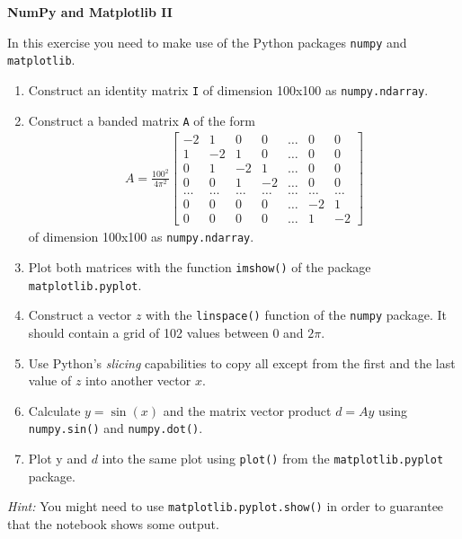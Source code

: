 \textbf{NumPy and Matplotlib II}

In this exercise you need to make use of the Python packages \verb|numpy| and \verb|matplotlib|.
\begin{enumerate}
\item Construct an identity matrix \texttt{I} of dimension 100x100 as \verb|numpy.ndarray|.
\item Construct a banded matrix \texttt{A} of the form 
\begin{align*}
				A = 	\frac{100^2}{4 \pi^2} \begin{bmatrix}
						-2&1 &0 &0&\dots&0&0\\
				 1&-2&1 &0&\dots&0&0\\
				 0&1&-2 &1&\dots&0&0\\
				 0&0&1 &-2&\dots&0&0\\
				 \dots &\dots   &\dots  & \dots&\dots&\dots &\dots\\
				 0& 0&0 &0&\dots&-2&1\\
				 0& 0&0 &0&\dots&1&-2     
					\end{bmatrix} 
\end{align*}
of dimension 100x100 as \verb|numpy.ndarray|.
\item Plot both matrices with the function \verb|imshow()| of the package \verb|matplotlib.pyplot|. 
\item Construct a vector $z$ with the \verb|linspace()| function of the \verb|numpy| package. It should contain a grid of 102 values between 0 and $2\pi$. 
\item Use Python's \textit{slicing} capabilities to copy all except from the first and the last value of $z$ into another vector $x$.
\item Calculate $y = \sin(x)$ and the matrix vector product $d = Ay$ using \verb|numpy.sin()| and \verb|numpy.dot()|.
\item Plot y and $d$ into the same plot using \verb|plot()| from the \verb|matplotlib.pyplot| package.
\end{enumerate}
\textit{Hint:} You might need to use \verb|matplotlib.pyplot.show()| in order to guarantee that the notebook shows some output.
